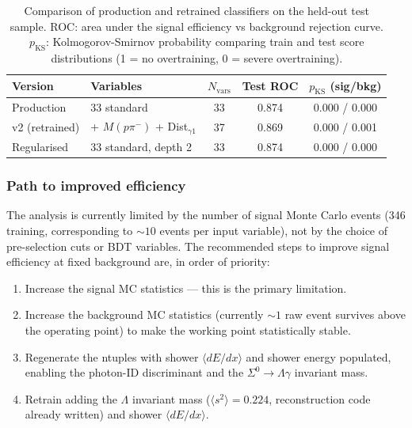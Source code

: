 \documentclass[12pt,a4paper]{article}
\begin{document}
\begin{table}[H]
  \centering
  \caption{Comparison of production and retrained classifiers on the
           held-out test sample.  ROC: area under the signal efficiency vs
           background rejection curve.  $p_\text{KS}$: Kolmogorov-Smirnov
           probability comparing train and test score distributions
           (1 = no overtraining, 0 = severe overtraining).}
  \label{tab:retrain}
  \begin{tabular}{llccc}
    \toprule
    Version & Variables & $N_\text{vars}$ & Test ROC & $p_\text{KS}$ (sig/bkg) \\
    \midrule
    Production       & 33 standard              & 33 & 0.874 & 0.000 / 0.000 \\
    v2 (retrained)   & + $M(p\pi^-)$ + Dist$_{\gamma 1}$ & 37 & 0.869 & 0.000 / 0.001 \\
    Regularised      & 33 standard, depth 2     & 33 & 0.874 & 0.000 / 0.000 \\
    \bottomrule
  \end{tabular}
\end{table}

\subsubsection*{Path to improved efficiency}

The analysis is currently limited by the number of signal Monte Carlo
events (346 training, corresponding to $\sim10$ events per input variable),
not by the choice of pre-selection cuts or BDT variables.
The recommended steps to improve signal efficiency at fixed background are,
in order of priority:
\begin{enumerate}
  \item Increase the signal MC statistics — this is the primary limitation.
  \item Increase the background MC statistics (currently $\sim1$ raw event
        survives above the operating point) to make the working point
        statistically stable.
  \item Regenerate the ntuples with shower $\langle dE/dx\rangle$ and
        shower energy populated, enabling the photon-ID discriminant and the
        $\Sigma^0\to\Lambda\gamma$ invariant mass.
  \item Retrain adding the $\Lambda$ invariant mass ($\langle s^2\rangle = 0.224$,
        reconstruction code already written) and shower $\langle dE/dx\rangle$.
\end{enumerate}
\end{document}
